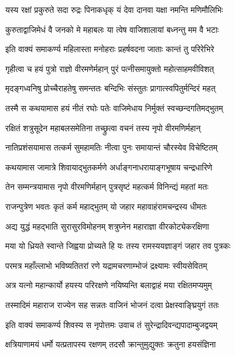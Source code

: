 \twolineshloka
{यस्य रक्षां प्रकुरुते सदा रुद्रः पिनाकधृक्}
{यं देवा दानवा यक्षा नमन्ति मणिमौलिभिः}%

\twolineshloka
{कुरुताद्वाजिमेधं वै जनको मे महाबलः}
{या त्वेष वाजिशालायां बध्नन्तु मम वै भटाः}%

\twolineshloka
{इति वाक्यं समाकर्ण्य महिलास्ता मनोहराः}
{प्रहर्षवदना जाताः कान्तं तु परिरेभिरे}%

\twolineshloka
{गृहीत्वा च हयं पुत्रो राज्ञो वीरमणेर्महान्}
{पुरं पत्नीसमायुक्तो महोत्साहमवीविशत्}%

\twolineshloka
{मृदङ्गध्वनिषु प्रोच्चैराहतेषु समन्ततः}
{बन्दिभिः संस्तुतः प्रागात्स्वपितुर्मन्दिरं महत्}%

\twolineshloka
{तस्मै स कथयामास हयं नीतं रघोः पतेः}
{वाजिमेधाय निर्मुक्तं स्वच्छन्दगतिमद्भुतम्}%

\twolineshloka
{रक्षितं शत्रुसूदेन महाबलसमेतिना}
{तच्छ्रुत्वा वचनं तस्य नृपो वीरमणिर्महान्}%

\twolineshloka
{नातिप्रशंसयामास तत्कर्म सुमहामतिः}
{नीत्वा पुनः समायान्तं चौरस्येव विचेष्टितम्}%

\twolineshloka
{कथयामास जामात्रे शिवायाद्भुतकर्मणे}
{अर्धाङ्गनाधरायाङ्गभूषाय चन्द्रधारिणे}%

\twolineshloka
{तेन सम्मन्त्रयामास नृपो वीरमणिर्महान्}
{पुत्रसृष्टं महत्कर्म विनिन्द्यं महतां मतः}%


\twolineshloka
{राजन्पुत्रेण भवतः कृतं कर्म महाद्भुतम्}
{यो जहार महावाहंरामचन्द्रस्य धीमतः}%

\twolineshloka
{अद्य युद्धं महद्भाति सुरासुरविमोहनम्}
{शत्रुघ्नेन महाराज्ञा वीरकोट्येकरक्षिणा}%

\twolineshloka
{मया यो ध्रियते स्वान्ते जिह्वया प्रोच्यते हि यः}
{तस्य रामस्ययज्ञाङ्गं जहार तव पुत्रकः}%

\twolineshloka
{परमत्र महाँल्लाभो भविष्यतितरां रणे}
{यद्रामचरणाम्भोजं द्रक्ष्यामः स्वीयसेवितम्}%

\twolineshloka
{अत्र यत्नो महान्कार्यो हयस्य परिरक्षणे}
{नयिष्यन्ति बलाद्वाहं मया रक्षितमप्यमुम्}%

\twolineshloka
{तस्मादिमं महाराज राज्येन सह सन्नतः}
{वाजिनं भोजनं दत्वा प्रेक्षस्वाङ्घ्रियुगं ततः}%

\twolineshloka
{इति वाक्यं समाकर्ण्य शिवस्य स नृपोत्तमः}
{उवाच तं सुरेन्द्रादिवन्द्यपादाम्बुजद्वयम्}%


\twolineshloka
{क्षत्रियाणामयं धर्मो यत्प्रतापस्य रक्षणम्}
{तदसौ क्रान्तुमुद्युक्तः क्रतुना हयसंज्ञिना}%

